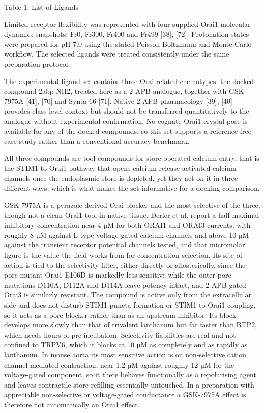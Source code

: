 Table 1. List of Ligands

Limited receptor flexibility was represented with four supplied Orai1 molecular-dynamics snapshots: Fr0, Fr300, Fr400 and Fr499 {[}38{]}, {[}72{]}. Protonation states were prepared for pH 7.0 using the stated Poisson-Boltzmann and Monte Carlo workflow. The selected ligands were treated consistently under the same preparation protocol.

The experimental ligand set contains three Orai-related chemotypes: the docked compound 2abp-NH2, treated here as a 2-APB analogue, together with GSK-7975A {[}41{]}, {[}70{]} and Synta-66 {[}71{]}. Native 2-APB pharmacology {[}39{]}, {[}40{]} provides class-level context but should not be transferred quantitatively to the analogue without experimental confirmation. No cognate Orai1 crystal pose is available for any of the docked compounds, so this set supports a reference-free case study rather than a conventional accuracy benchmark.

All three compounds are tool compounds for store-operated calcium entry, that is the STIM1 to Orai1 pathway that opens calcium release-activated calcium channels once the endoplasmic store is depleted, yet they act on it in three different ways, which is what makes the set informative for a docking comparison.

GSK-7975A is a pyrazole-derived Orai blocker and the most selective of the three, though not a clean Orai1 tool in native tissue. Derler et al. report a half-maximal inhibitory concentration near 4 µM for both ORAI1 and ORAI3 currents, with roughly 8 µM against L-type voltage-gated calcium channels and above 10 µM against the transient receptor potential channels tested, and that micromolar figure is the value the field works from for concentration selection. Its site of action is tied to the selectivity filter, either directly or allosterically, since the pore mutant Orai1-E106D is markedly less sensitive while the outer-pore mutations D110A, D112A and D114A leave potency intact, and 2-APB-gated Orai3 is similarly resistant. The compound is active only from the extracellular side and does not disturb STIM1 puncta formation or STIM1 to Orai1 coupling, so it acts as a pore blocker rather than as an upstream inhibitor. Its block develops more slowly than that of trivalent lanthanum but far faster than BTP2, which needs hours of pre-incubation. Selectivity liabilities are real and not confined to TRPV6, which it blocks at 10 µM as completely and as rapidly as lanthanum. In mouse aorta its most sensitive action is on non-selective cation channel-mediated contraction, near 1.2 µM against roughly 12 µM for the voltage-gated component, so it there behaves functionally as a repolarising agent and leaves contractile store refilling essentially untouched. In a preparation with appreciable non-selective or voltage-gated conductance a GSK-7975A effect is therefore not automatically an Orai1 effect.

